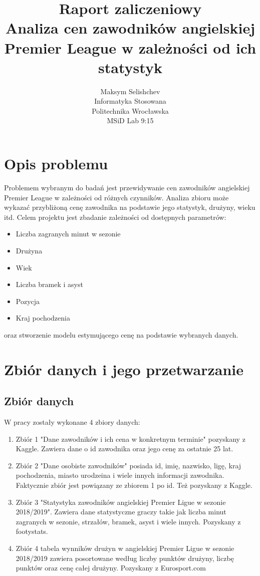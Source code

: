 \documentclass{article}
\title{Raport zaliczeniowy \\
Analiza cen zawodników angielskiej Premier League w zależności od ich statystyk}
\author{Maksym Selishchev \\
Informatyka Stosowana \\
Politechnika Wrocławska \\
MSiD Lab 9:15}
\begin{document}
\maketitle

\section{Opis problemu}

Problemem wybranym do badań jest przewidywanie cen zawodników angielskiej Premier League w zależności od różnych czynników. Analiza zbioru może wykazać przybliżoną cenę zawodnika na podstawie jego statystyk, drużyny, wieku itd. Celem projektu jest zbadanie zależności od dostępnych parametrów:
\begin{itemize}
    \item Liczba zagranych minut w sezonie
    \item Drużyna
    \item Wiek
    \item Liczba bramek i asyst
    \item Pozycja
    \item Kraj pochodzenia
\end{itemize}
oraz stworzenie modelu estymującego cenę na podstawie wybranych danych.




\section{Zbiór danych i jego przetwarzanie}

\subsection{Zbiór danych}
W pracy zostały wykonane 4 zbiory danych:
\begin{enumerate}
    \item Zbiór 1 "Dane zawodników i ich cena w konkretnym terminie"  pozyskany z Kaggle. Zawiera dane o id zawodnika oraz jego cenę za ostatnie 25 lat.
    \item Zbiór 2 "Dane osobiste zawodników" posiada id, imię, nazwisko, ligę, kraj pochodzenia, miasto urodzeina i wiele innych informacji zawodnika. Faktycznie zbiór jest powiązany ze zbiorem 1 po id. Też pozyskany z Kaggle.
    \item Zbiór 3 "Statystyka zawodników angielskiej Premier Ligue w sezonie 2018/2019". Zawiera dane statystyczne graczy takie jak liczba minut zagranych w sezonie, strzałów, bramek, asyst i wiele innych. Pozyskany z footystats.
    \item Zbiór 4 tabela wynników drużyn w angielskiej Premier Ligue w sezonie 2018/2019 zawiera posortowane według liczby punktów drużyny, liczbę punktów oraz cenę całej drużyny. Pozyskany z Eurosport.com 
\end{enumerate}
\end{document}
